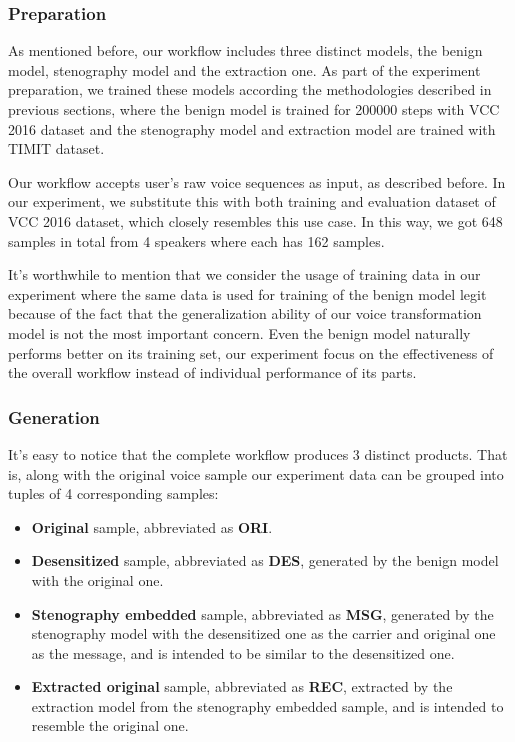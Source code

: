 \documentclass[journal]{IEEEtran} %
\begin{document}
\subsubsection{Preparation}

As mentioned before, our workflow includes three distinct models, the benign model, stenography model and the extraction one. As part of the experiment preparation, we trained these models according the methodologies described in previous sections, where the benign model is trained for 200000 steps with VCC 2016 dataset and the stenography model and extraction model are trained with TIMIT dataset.

Our workflow accepts user's raw voice sequences as input, as described before. In our experiment, we substitute this with both training and evaluation dataset of VCC 2016 dataset, which closely resembles this use case. In this way, we got 648 samples in total from 4 speakers where each has 162 samples.

It's worthwhile to mention that we consider the usage of training data in our experiment where the same data is used for training of the benign model legit because of the fact that the generalization ability of our voice transformation model is not the most important concern. Even the benign model naturally performs better on its training set, our experiment focus on the effectiveness of the overall workflow instead of individual performance of its parts.

\subsubsection{Generation}

It's easy to notice that the complete workflow produces 3 distinct products. That is, along with the original voice sample our experiment data can be grouped into tuples of 4 corresponding samples:

\begin{itemize}
    \item \textbf{Original} sample, abbreviated as \textbf{ORI}.
    \item \textbf{Desensitized} sample, abbreviated as \textbf{DES}, generated by the benign model with the original one.
    \item \textbf{Stenography embedded} sample, abbreviated as \textbf{MSG}, generated by the stenography model with the desensitized one as the carrier and original one as the message, and is intended to be similar to the desensitized one.
    \item \textbf{Extracted original} sample, abbreviated as \textbf{REC}, extracted by the extraction model from the stenography embedded sample, and is intended to resemble the original one.
\end{itemize}
\end{document}
